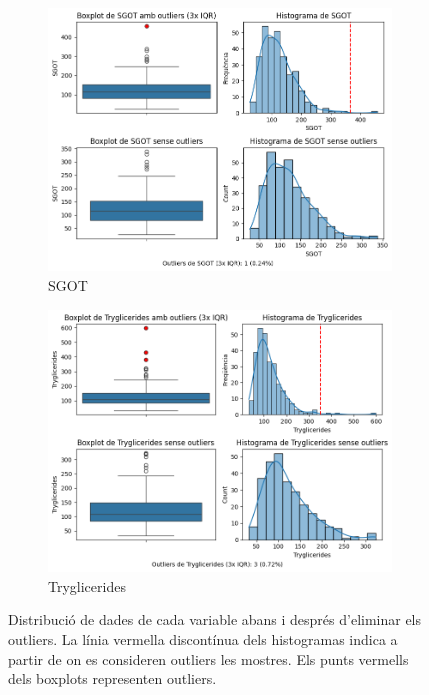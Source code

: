 \begin{figure}[H]
\begin{subfigure}{.5\textwidth}
  \includegraphics[width=.95\linewidth]{img/outliers_SGOT.png}
  \caption{SGOT}
\end{subfigure}%
\begin{subfigure}{.5\textwidth}
  \centering
  \includegraphics[width=.95\linewidth]{img/outliers_Tryglicerides.png}
  \caption{Tryglicerides}
\end{subfigure}

\caption{Distribució de dades de cada variable abans i després d'eliminar els outliers. La línia vermella discontínua dels histogramas indica a partir de on es consideren outliers les mostres. Els punts vermells dels boxplots representen outliers.}
\label{fig:outliers-2}
\end{figure}

